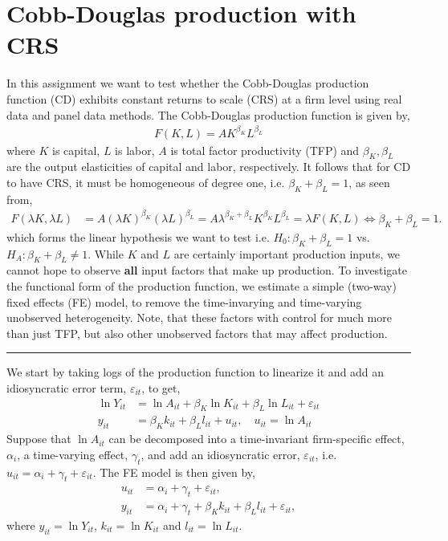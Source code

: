 \section{Cobb-Douglas production with CRS}

In this assignment we want to test whether the Cobb-Douglas production function (CD) exhibits constant returns to scale (CRS) at a firm level using real data and panel data methods. The Cobb-Douglas production function is given by,
\begin{align*}
    F(K,L) = A K^{\beta_K} L^{\beta_L}
\end{align*}
where $K$ is capital, $L$ is labor, $A$ is total factor productivity (TFP) and $\beta_K, \beta_L$ are the output elasticities of capital and labor, respectively.
It follows that for CD to have CRS, it must be homogeneous of degree one, i.e. $\beta_K + \beta_L = 1$, as seen from,
\begin{align*}
    F(\lambda K, \lambda L) &= A (\lambda K)^{\beta_K} (\lambda L)^{\beta_L} = A \lambda^{\beta_K + \beta_L} K^{\beta_K} L^{\beta_L} = \lambda F(K,L) \iff \beta_K + \beta_L = 1.
\end{align*} 
which forms the linear hypothesis we want to test i.e. $H_0: \beta_K + \beta_L = 1$ vs. $H_A: \beta_K + \beta_L \neq 1$.
While $K$ and $L$ are certainly important production inputs, we cannot hope to observe \textbf{all} input factors that make up production. To investigate the functional form of the production function, we estimate a simple (two-way) fixed effects (FE) model, to remove the time-invarying and time-varying unobserved heterogeneity. Note, that these factors with control for much more than just TFP, but also other unobserved factors that may affect production. 

\hrule

We start by taking logs of the production function to linearize it and add an idiosyncratic error term, $\varepsilon_{it}$, to get,
\begin{align*}
    \ln Y_{it} &= \ln A_{it} + \beta_K \ln K_{it} + \beta_L \ln L_{it} + \varepsilon_{it} \\
    y_{it} &= \beta_K k_{it} + \beta_L l_{it} + u_{it}, \quad u_{it} = \ln A_{it}
\end{align*}
Suppose that $\ln A_{it}$ can be decomposed into a time-invariant firm-specific effect, $\alpha_i$, a time-varying effect, $\gamma_t$, and add an idiosyncratic error, $\varepsilon_{it}$, i.e. $u_{it} = \alpha_i + \gamma_t + \varepsilon_{it}$. The FE model is then given by,
\begin{align*}
    u_{it} &= \alpha_i + \gamma_t + \varepsilon_{it}, \\
    y_{it} &= \alpha_i + \gamma_t + \beta_K k_{it} + \beta_L l_{it} + \varepsilon_{it},
\end{align*} 
where $y_{it} = \ln Y_{it}$, $k_{it} = \ln K_{it}$ and $l_{it} = \ln L_{it}$. 

